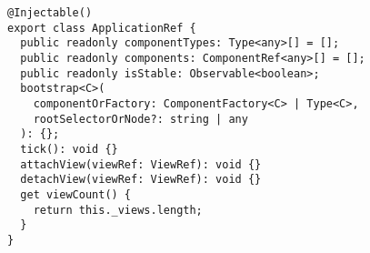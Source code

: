 \begin{verbatim}
@Injectable()
export class ApplicationRef {
  public readonly componentTypes: Type<any>[] = [];
  public readonly components: ComponentRef<any>[] = [];
  public readonly isStable: Observable<boolean>;
  bootstrap<C>(
    componentOrFactory: ComponentFactory<C> | Type<C>,
    rootSelectorOrNode?: string | any
  ): {};
  tick(): void {}
  attachView(viewRef: ViewRef): void {}
  detachView(viewRef: ViewRef): void {}
  get viewCount() {
    return this._views.length;
  }
}
\end{verbatim}
